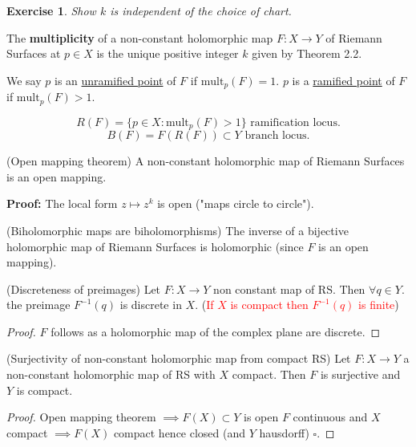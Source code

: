 \documentclass{article}
\newtheorem{exercise}{Exercise}
\begin{document}
\begin{exercise}
Show $k$ is independent of the choice of chart.
\end{exercise}
\begin{definition}
    The \textbf{multiplicity} of a non-constant holomorphic map $F: X \to Y$
    of Riemann Surfaces at $p \in X$ is the unique positive integer $k$ given by
    Theorem 2.2.
\end{definition}

We say $p$ is an \underline{unramified point} of $F$ if $\mathrm{mult}_p(F) = 1$.
$p$ is a \underline{ramified point} of $F$ if $\mathrm{mult}_p(F) > 1$.

$$
R(F) = \{ p \in X : \mathrm{mult}_p(F) > 1 \} \text{ ramification locus.}
$$
$$
B(F) = F(R(F)) \subset Y \text{ branch locus.}
$$

\begin{theorem}
    (Open mapping theorem) \label{thm:openmapping}
    A non-constant holomorphic map of Riemann Surfaces is an open mapping.
\end{theorem}

\textbf{Proof:} The local form $z \mapsto z^k$ is open
("maps circle to circle").

\begin{theorem}
    (Biholomorphic maps are biholomorphisms) \label{thm:biholo}
    The inverse of a bijective holomorphic map of Riemann Surfaces is holomorphic
    (since $F$ is an open mapping).
\end{theorem}

\begin{theorem}
(Discreteness of preimages)
Let $F: X \to Y$ non constant map of RS. Then $\forall q \in Y$.
the preimage $F^{-1}(q)$ is discrete in $X$.
(\textcolor{red}{If $X$ is compact then $F^{-1}(q)$ is finite})
\end{theorem}

\begin{proof}
$F$ follows as a holomorphic map of the complex plane are discrete.
\end{proof}

\begin{theorem}
(Surjectivity of non-constant holomorphic map from compact RS)
Let $F: X \to Y$ a non-constant holomorphic map of RS with $X$ compact.
Then $F$ is surjective and $Y$ is compact.
\end{theorem}

\begin{proof}
Open mapping theorem $\implies F(X) \subset Y$ is open
$F$ continuous and $X$ compact $\implies F(X)$ compact hence closed (and $Y$ hausdorff) $\square$.
\end{proof}
\end{document}
